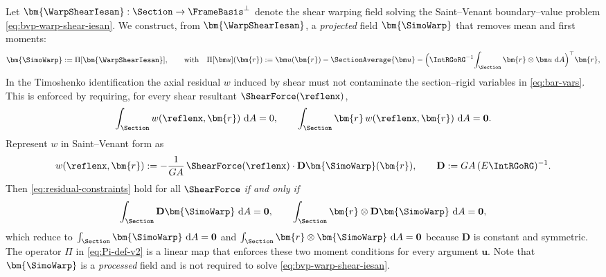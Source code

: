 \begin{Quote}
Let $\bm{\WarpShearIesan}:\Section\to\FrameBasis^\perp$ denote the shear warping field solving the Saint–Venant boundary–value problem \eqref{eq:bvp-warp-shear-iesan}. 
We construct, from $\bm{\WarpShearIesan}$, a \emph{projected} field $\bm{\SimoWarp}$ that removes mean and first moments:
\begin{equation}
\label{eq:Pi-def-v2}
\bm{\SimoWarp}:=\Pi[\bm{\WarpShearIesan}],
\qquad\text{with}\quad
\begin{aligned}
\Pi[\bm u](\bm{r})&:=\bm u(\bm{r})
-\SectionAverage{\bm u}
-\Big(\IntRGoRG^{-1}\!\int_{\Section}\bm{r}\otimes\bm u\mathrm{~d}A\Big)^{\top}\bm{r}, \\
\end{aligned}
\end{equation}
In the Timoshenko identification the axial residual $w$ induced by shear must not contaminate the section–rigid variables in \eqref{eq:bar-vars}. 
This is enforced by requiring, for every shear resultant $\ShearForce(\reflenx)$,
\begin{equation}
\int_{\Section}w(\reflenx,\bm{r})\mathrm{~d}A=0,\qquad \int_{\Section}\bm{r}\,w(\reflenx,\bm{r})\mathrm{~d}A=\mathbf{0}.
\label{eq:residual-constraints}
\end{equation}
Represent $w$ in Saint–Venant form as
\begin{equation}
\label{eq:w-def}
w(\reflenx,\bm{r}):=-\frac{1}{GA}\,\ShearForce(\reflenx)\cdot \mathbf{D}\bm{\SimoWarp}(\bm{r}),
\qquad
\mathbf{D}:= GA\,(E\IntRGoRG)^{-1}.
\end{equation}
Then \eqref{eq:residual-constraints} hold for all $\ShearForce$ \emph{if and only if}
\[
\int_{\Section}\mathbf{D}\bm{\SimoWarp}\mathrm{~d}A=\mathbf{0},
\qquad
\int_{\Section}\bm{r}\otimes\mathbf{D}\bm{\SimoWarp}\mathrm{~d}A=\mathbf{0},
\]
which reduce to $\int_{\Section}\bm{\SimoWarp}\mathrm{~d}A=\mathbf{0}$ and $\int_{\Section}\bm{r}\otimes\bm{\SimoWarp}\mathrm{~d}A=\mathbf{0}$ because $\mathbf{D}$ is constant and symmetric. The operator $\Pi$ in \eqref{eq:Pi-def-v2} is a linear map that enforces these two moment conditions for every argument $\bm u$. 
Note that $\bm{\SimoWarp}$ is a \emph{processed} field and is not required to solve \eqref{eq:bvp-warp-shear-iesan}.
\end{Quote}


